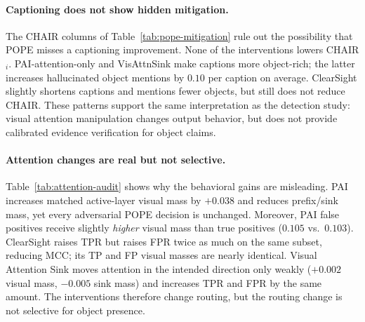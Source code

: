 \paragraph{Captioning does not show hidden mitigation.} The CHAIR columns of Table~\ref{tab:pope-mitigation} rule out the possibility that POPE misses a captioning improvement. None of the interventions lowers CHAIR$_i$. PAI-attention-only and VisAttnSink make captions more object-rich; the latter increases hallucinated object mentions by $0.10$ per caption on average. ClearSight slightly shortens captions and mentions fewer objects, but still does not reduce CHAIR. These patterns support the same interpretation as the detection study: visual attention manipulation changes output behavior, but does not provide calibrated evidence verification for object claims.

\paragraph{Attention changes are real but not selective.} Table~\ref{tab:attention-audit} shows why the behavioral gains are misleading. PAI increases matched active-layer visual mass by $+0.038$ and reduces prefix/sink mass, yet every adversarial POPE decision is unchanged. Moreover, PAI false positives receive slightly \emph{higher} visual mass than true positives ($0.105$ vs.\ $0.103$). ClearSight raises TPR but raises FPR twice as much on the same subset, reducing MCC; its TP and FP visual masses are nearly identical. Visual Attention Sink moves attention in the intended direction only weakly ($+0.002$ visual mass, $-0.005$ sink mass) and increases TPR and FPR by the same amount. The interventions therefore change routing, but the routing change is not selective for object presence.

